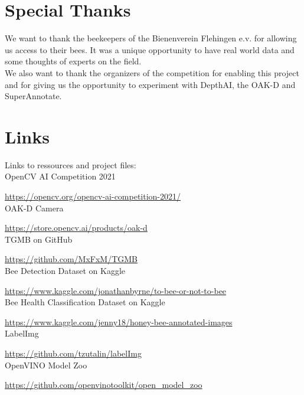 \documentclass[a4paper,titlepage]{article}
\begin{document}
\newpage
\section{Special Thanks}

We want to thank the beekeepers of the Bienenverein Flehingen e.v. for allowing us access to their bees.
It was a unique opportunity to have real world data and some thoughts of experts on the field.\\

We also want to thank the organizers of the competition for enabling this project and for giving us the opportunity to experiment with DepthAI, the OAK-D and SuperAnnotate.

\newpage
\section{Links}

Links to ressources and project files: \\

OpenCV AI Competition 2021

\href{https://opencv.org/opencv-ai-competition-2021/}{https://opencv.org/opencv-ai-competition-2021/} \\

OAK-D Camera

\href{https://store.opencv.ai/products/oak-d}{https://store.opencv.ai/products/oak-d} \\

TGMB on GitHub

\href{https://github.com/MxFxM/TGMB}{https://github.com/MxFxM/TGMB} \\

Bee Detection Dataset on Kaggle

\href{https://www.kaggle.com/jonathanbyrne/to-bee-or-not-to-bee}{https://www.kaggle.com/jonathanbyrne/to-bee-or-not-to-bee} \\

Bee Health Classification Dataset on Kaggle

\href{https://www.kaggle.com/jenny18/honey-bee-annotated-images}{https://www.kaggle.com/jenny18/honey-bee-annotated-images} \\

LabelImg

\href{https://github.com/tzutalin/labelImg}{https://github.com/tzutalin/labelImg} \\

OpenVINO Model Zoo

\href{https://github.com/openvinotoolkit/open_model_zoo}{https://github.com/openvinotoolkit/open\_model\_zoo} \\
\end{document}
